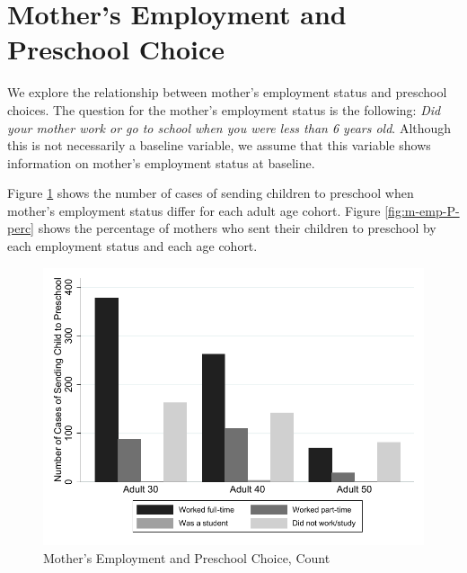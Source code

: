 
\section{Mother's Employment and Preschool Choice}

We explore the relationship between mother's employment status and preschool choices. The question for the mother's employment status is the following: \textit{Did your mother work or go to school when you were less than 6 years old}. Although this is not necessarily a baseline variable, we assume that this variable shows information on mother's employment status at baseline.

Figure \ref{fig:m-emp-P-count} shows the number of cases of sending children to preschool when mother's employment status differ for each adult age cohort. Figure \ref{fig:m-emp-P-perc} shows the percentage of mothers who sent their children to preschool by each employment status and each age cohort. 

\begin{figure}[H] \caption{Mother's Employment and Preschool Choice, Count} \label{fig:m-emp-P-count}
\centering
\includegraphics[scale=0.9]{../../../../output/image/bar_momworkpreschool_count.pdf}
\end{figure}

